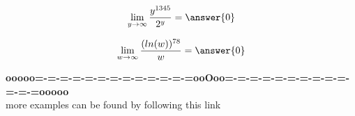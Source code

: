 \documentclass{ximera}
\begin{document}
\begin{question}

\[
\lim\limits_{y \to \infty} \frac{y^{1345}}{2^y} = \answer{0}
\]

\end{question}












\begin{question}

\[
\lim\limits_{w \to \infty} \frac{(ln(w))^{78}}{w} = \answer{0}
\]

\end{question}



















\begin{center}
\textbf{\textcolor{green!50!black}{ooooo=-=-=-=-=-=-=-=-=-=-=-=-=ooOoo=-=-=-=-=-=-=-=-=-=-=-=-=ooooo}} \\

more examples can be found by following this link\\ 

\end{center}
\end{document}
